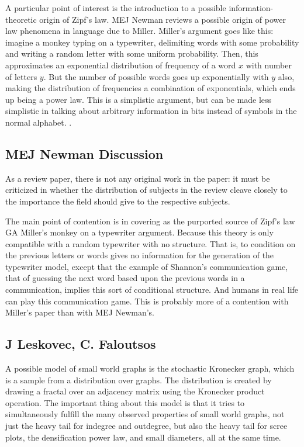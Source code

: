\documentclass[12pt]{article}
\begin{document}
A particular point of interest is the introduction to a possible information-theoretic origin of Zipf's law. MEJ Newman reviews a possible origin of power law phenomena in language due to Miller. Miller's argument goes like this: imagine a monkey typing on a typewriter, delimiting words with some probability and writing a random letter with some uniform probability. Then, this approximates an exponential distribution of frequency of a word $x$ with number of letters $y$. But the number of possible words goes up exponentially with $y$ also, making the distribution of frequencies a combination of exponentials, which ends up being a power law. This is a simplistic argument, but can be made less simplistic in talking about arbitrary information in bits instead of symbols in the normal alphabet. %
. 
\subsection{MEJ Newman Discussion}

As a review paper, there is not any original work in the paper: it must be criticized in whether the distribution of subjects in the review cleave closely to the importance the field should give to the respective subjects. %

The main point of contention is in covering as the purported source of Zipf's law GA Miller's monkey on a typewriter argument. Because this theory is only compatible with a random typewriter with no structure. That is, to condition on the previous letters or words gives no information for the generation of the typewriter model, except that the example of Shannon's communication game, that of guessing the next word based upon the previous words in a communication, implies this sort of conditional structure. And humans in real life can play this communication game. This is probably more of a contention with Miller's paper than with MEJ Newman's.

\subsection{J Leskovec, C. Faloutsos}
A possible model of small world graphs is the stochastic Kronecker graph, which is a sample from a distribution over graphs. The distribution is created by drawing a fractal over an adjacency matrix using the Kronecker product operation. The important thing about this model is that it tries to simultaneously fulfill the many observed properties of small world graphs, not just the heavy tail for indegree and outdegree, but also the heavy tail for scree plots, the densification power law, and small diameters, all at the same time.
\end{document}
